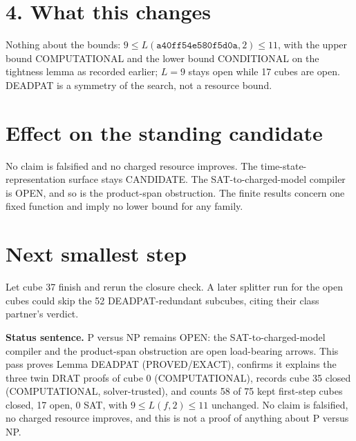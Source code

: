 \documentclass[11pt]{article}
\begin{document}
\section*{4. What this changes}
Nothing about the bounds: $9\le L(\texttt{a40ff54e580f5d0a},2)\le 11$, with the upper bound COMPUTATIONAL and the lower bound CONDITIONAL on the tightness lemma as recorded earlier; $L=9$ stays open while 17 cubes are open. DEADPAT is a symmetry of the search, not a resource bound.

\section*{Effect on the standing candidate}
No claim is falsified and no charged resource improves. The time-state-representation surface stays CANDIDATE. The SAT-to-charged-model compiler is OPEN, and so is the product-span obstruction. The finite results concern one fixed function and imply no lower bound for any family.

\section*{Next smallest step}
Let cube 37 finish and rerun the closure check. A later splitter run for the open cubes could skip the 52 DEADPAT-redundant subcubes, citing their class partner's verdict.

\bigskip
\noindent\textbf{Status sentence.} P versus NP remains OPEN: the SAT-to-charged-model compiler and the product-span obstruction are open load-bearing arrows. This pass proves Lemma DEADPAT (PROVED/EXACT), confirms it explains the three twin DRAT proofs of cube 0 (COMPUTATIONAL), records cube 35 closed (COMPUTATIONAL, solver-trusted), and counts 58 of 75 kept first-step cubes closed, 17 open, 0 SAT, with $9\le L(f,2)\le 11$ unchanged. No claim is falsified, no charged resource improves, and this is not a proof of anything about P versus NP.
\end{document}
